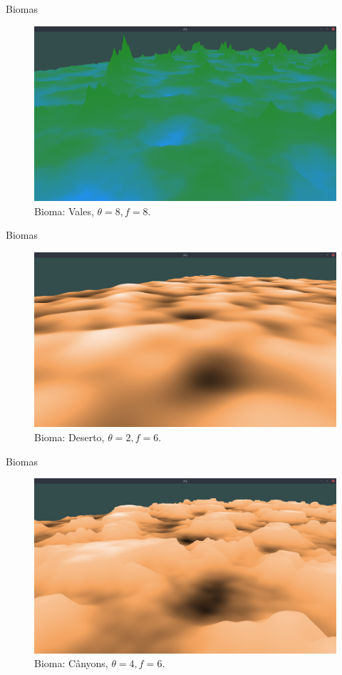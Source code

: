 \begin{frame}{Biomas}
    \begin{figure}[H]
        \centering
        \includegraphics[width=.9\textwidth]{img/biomas/bssValley.png}
        \caption{Bioma: Vales, $\theta = 8, f = 8$.}
        \label{fig:img_biomas_bssValley}
    \end{figure}
    
    
\end{frame}

\begin{frame}{Biomas}
    \begin{figure}[H]
        \centering
        \includegraphics[width=.9\textwidth]{img/biomas/bssDesert.png}
        \caption{Bioma: Deserto, $\theta = 2, f = 6$.}
        \label{fig:img_biomas_bssDesert}
    \end{figure}
    
    
\end{frame}

\begin{frame}{Biomas}
    \begin{figure}[H]
        \centering
        \includegraphics[width=.9\textwidth]{img/biomas/bssCanyons.png}
        \caption{Bioma: Cânyons, $\theta = 4, f = 6$.}
        \label{fig:img_biomas_bssCanyons}
    \end{figure}
    
    
\end{frame}